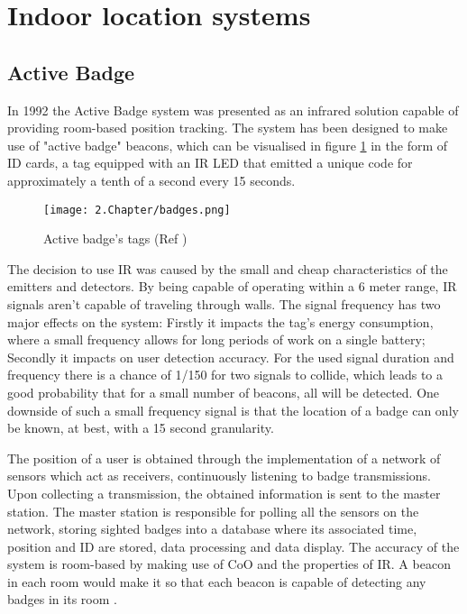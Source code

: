 \section{Indoor location systems}  
\label{sec:related}  
  
  
\subsection{Active Badge}  
\label{subsec:badge}  
  
  
In 1992 the Active Badge system \cite{badge} was presented as an infrared solution capable of providing room-based position tracking. The system has been designed to make use of "active badge" beacons, which can be visualised in figure \ref{fig:badge} in the form of ID cards, a tag equipped with an \ac{IR} LED that emitted a unique code for approximately a tenth of a second every 15 seconds.  
  
  
\begin{figure}[H]  
\centering  
\texttt{[image: 2.Chapter/badges.png]}  
\caption[Active badge's tags (Ref \cite{badgefig}) ]{Active badge's tags (Ref \cite{badgefig}) }  
\label{fig:badge}  
\end{figure}  
  
  
The decision to use \ac{IR} was caused by the small and cheap characteristics of the emitters and detectors\cite{badge2}. By being capable of operating within a 6 meter range, \ac{IR} signals aren’t capable of traveling through walls. The signal frequency has two major effects on the system: Firstly it impacts the tag's energy consumption, where a small frequency allows for long periods of work on a single battery; Secondly it impacts on user detection accuracy. For the used signal duration and frequency there is a chance of 1/150 for two signals to collide, which leads to a good probability that for a small number of beacons, all will be detected. One downside of such a small frequency signal is that the location of a badge can only be known, at best, with a 15 second granularity.  
  
The position of a user is obtained through the implementation of a network of sensors which act as receivers, continuously listening to badge transmissions. Upon collecting a transmission, the obtained information is sent to the master station. The master station is responsible for polling all the sensors on the network, storing sighted badges into a database where its associated time, position and ID are stored, data processing and data display. The accuracy of the system is room-based by making use of \ac{CoO} and the properties of \ac{IR}. A beacon in each room would make it so that each beacon is capable of detecting any badges in its room \cite{badge1}.  
  
